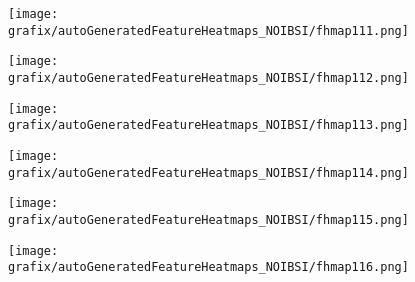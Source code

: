 \hspace{\hsp} 
\begin{subfigure}{\wid\textwidth} 
    \centering 
    \caption{\tiny \sffamily {}} 
    \vspace{\vsp} 
    \texttt{[image: grafix/autoGeneratedFeatureHeatmaps\_NOIBSI/fhmap111.png]} 
\end{subfigure} 
\hspace{\hsp} 
\begin{subfigure}{\wid\textwidth} 
    \centering 
    \caption{\tiny \sffamily {}} 
    \vspace{\vsp} 
    \texttt{[image: grafix/autoGeneratedFeatureHeatmaps\_NOIBSI/fhmap112.png]} 
\end{subfigure} 
\hspace{\hsp} 
\begin{subfigure}{\wid\textwidth} 
    \centering 
    \caption{\tiny \sffamily {}} 
    \vspace{\vsp} 
    \texttt{[image: grafix/autoGeneratedFeatureHeatmaps\_NOIBSI/fhmap113.png]} 
\end{subfigure} 
\hspace{\hsp} 
\begin{subfigure}{\wid\textwidth} 
    \centering 
    \caption{\tiny \sffamily {}} 
    \vspace{\vsp} 
    \texttt{[image: grafix/autoGeneratedFeatureHeatmaps\_NOIBSI/fhmap114.png]} 
\end{subfigure} 
\hspace{\hsp} 
\begin{subfigure}{\wid\textwidth} 
    \centering 
    \caption{\tiny \sffamily {}} 
    \vspace{\vsp} 
    \texttt{[image: grafix/autoGeneratedFeatureHeatmaps\_NOIBSI/fhmap115.png]} 
\end{subfigure} 
\hspace{\hsp} 
\begin{subfigure}{\wid\textwidth} 
    \centering 
    \caption{\tiny \sffamily {}} 
    \vspace{\vsp} 
    \texttt{[image: grafix/autoGeneratedFeatureHeatmaps\_NOIBSI/fhmap116.png]} 
\end{subfigure} 
\hspace{\hsp} 
